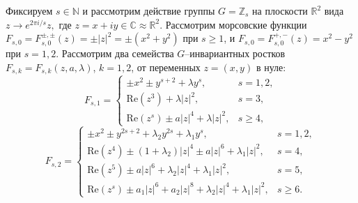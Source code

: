 \vzmstitle[
\footnote{Автор является стипендиатом Фонда развития теоретической физики и математики <<БАЗИС>>.}
]{
	Бифуркации критических точек гладких инвариантных функций: классификация и приложение к интегрируемым системам
}


\vzmscaption

Фиксируем $s\in\mathbb N$ и рассмотрим действие группы $G=\mathbb{Z}_s$ на плоскости $\mathbb{R}^2$ вида
$z\longrightarrow e^{2\pi i/{s}}z,$ где $z=x+iy\in\mathbb C\approx\mathbb{R}^2.$
Рассмотрим морсовские функции $F_{s,0}=F_{s,0}^{\pm,\pm}(z)=\pm|z|^2=\pm (x^2+y^2)$ при $s\ge1$, и $F_{s,0}=F_{s,0}^{+,-}(z)=x^2-y^2$ при $s=1,2$. Рассмотрим два семейства $G$--инвариантных ростков $F_{s,k}=F_{s,k}(z,a,\lambda)$, $k=1,2$, от переменных $z=(x,y)$ в нуле:
\begin{equation*} \label{On_sistem1}
F_{s,1}
=\left\{
\begin{array}{ll}
\pm x^2\pm y^{s+2} +\lambda y^s, & s=1,2, \\
\mathrm{Re}(z^3)+\lambda|z|^2, & s=3, \\
\mathrm{Re}(z^s)\pm a|z|^4+\lambda |z|^2, & s\ge4,
\end{array}
\right.
\end{equation*}
\begin{equation*} \label{On_sistem2}
F_{s,2}
=\left\{
\begin{array}{ll}
\pm x^2\pm y^{2s+2} +\lambda_2 y^{2s}+\lambda_1 y^s, & s=1,2, \\
\mathrm{Re}(z^4)\pm
(1+\lambda_2)
|z|^4 \pm a|z|^6+
\lambda_1 |z|^2
, & s=4, \\ %
\mathrm{Re}(z^5)\pm a|z|^6+
\lambda_2|z|^4+\lambda_1 |z|^2
, & s=5, \\ %
\mathrm{Re}(z^s)\pm a_1 |z|^6+ a_2 |z|^8+
\lambda_2|z|^4+\lambda_1 |z|^2
, & s\ge6.
\end{array}
\right.
\end{equation*}
